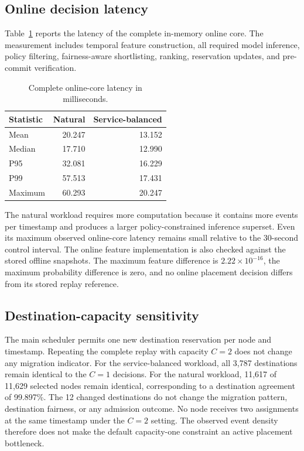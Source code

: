 \subsection{Online decision latency}
\label{sec:runtime}

Table~\ref{tab:runtime-results} reports the latency of the complete
in-memory online core. The measurement includes temporal feature
construction, all required model inference, policy filtering,
fairness-aware shortlisting, ranking, reservation updates, and
pre-commit verification.



\begin{table}[t]
\centering
\caption{Complete online-core latency in milliseconds.}
\label{tab:runtime-results}
\begin{tabular}{lrr}
\toprule
Statistic &
Natural &
Service-balanced \\
\midrule
Mean & 20.247 & 13.152 \\
Median & 17.710 & 12.990 \\
P95 & 32.081 & 16.229 \\
P99 & 57.513 & 17.431 \\
Maximum & 60.293 & 20.247 \\
\bottomrule
\end{tabular}
\end{table}

The natural workload requires more computation because it contains more
events per timestamp and produces a larger policy-constrained inference
superset. Even its maximum observed online-core latency remains small
relative to the 30-second control interval. The online feature implementation is also checked against the stored
offline snapshots. The maximum feature difference is
$2.22\times10^{-16}$, the maximum probability difference is zero, and
no online placement decision differs from its stored replay reference.

\subsection{Destination-capacity sensitivity}

The main scheduler permits one new destination reservation per node and
timestamp. Repeating the complete replay with capacity $C=2$ does not
change any migration indicator. For the service-balanced workload, all 3,787 destinations remain
identical to the $C=1$ decisions. For the natural workload, 11,617 of
11,629 selected nodes remain identical, corresponding to a destination
agreement of 99.897\%. The 12 changed destinations do not change the
migration pattern, destination fairness, or any admission outcome. No node receives two assignments at the same timestamp under the
$C=2$ setting. The observed event density therefore does not make the
default capacity-one constraint an active placement bottleneck.
